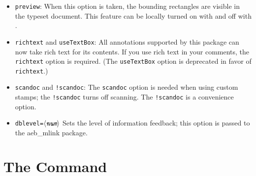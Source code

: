 \documentclass[12pt]{article}
\def\pkg{\textsf}
\let\app\textsf
\let\opt\texttt
\def\ameta#1{$\langle\textit{\texttt{#1}}\rangle$}
\begin{document}
\begin{itemize}
  \item \opt{preview}: When this option is taken, the bounding rectangles
      are visible in the typeset document. This feature can be locally
      turned on with  and off with .
  \item \opt{richtext} and \opt{useTextBox}: All annotations supported by
      this package can now take rich text for its contents. If you use rich
      text in your comments, the \opt{richtext} option is required. (The
      \opt{useTextBox} option is deprecated in favor of \opt{richtext}.)
  \item \opt{scandoc} and \opt{!scandoc}: The \opt{scandoc} option is
      needed when using custom stamps; the \opt{!scandoc} turns off
      scanning. The \opt{!scandoc} is a convenience option.
  \item \opt{dblevel=\ameta{num}} Sets the level of information feedback; this option
  is passed to the \pkg{aeb\_mlink} package.
\end{itemize}



\section{The \texorpdfstring{\protect{}}{} Command}
\end{document}
